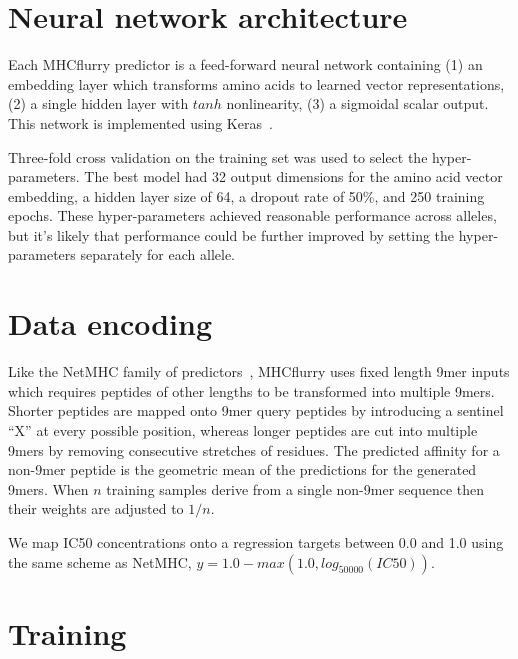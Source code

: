 \section{Neural network architecture}
Each MHCflurry predictor is a feed-forward neural network containing (1) an embedding layer which transforms amino acids to learned vector representations, (2) a single hidden layer with $tanh$ nonlinearity, (3) a sigmoidal scalar output. This network is implemented using Keras~\cite{keras}.  


Three-fold cross validation on the training set was used to select the hyper-parameters. The best model had 32 output dimensions for the amino acid vector embedding, a hidden layer size of 64, a dropout rate\cite{Srivastava2014} of 50\%, and 250 training epochs. These hyper-parameters achieved reasonable performance across alleles, but it's likely that performance could be further improved by setting the hyper-parameters separately for each allele.

\section{Data encoding}

Like the NetMHC family of predictors~\cite{lundegaard2008accurate}, MHCflurry uses fixed length 9mer inputs which requires peptides of other lengths to be transformed into multiple 9mers. Shorter peptides are mapped onto 9mer query peptides by introducing a sentinel ``X'' at every possible position, whereas longer peptides are cut into multiple 9mers by removing consecutive stretches of residues. The predicted affinity for a non-9mer peptide is the geometric mean of the predictions for the generated 9mers. When $n$ training samples derive from a single non-9mer sequence then their weights are adjusted to $1/n$. 

We map IC50 concentrations onto a regression targets between 0.0 and 1.0 using the same scheme as NetMHC, $y = 1.0 - max(1.0, log_{50000}(IC50))$.

\section{Training}

